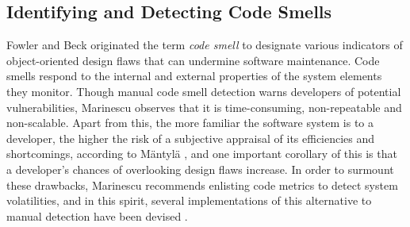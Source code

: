 \subsection{Identifying and Detecting Code Smells}
\revision Fowler and Beck \cite{fowler1999refactoring} originated the term \textit{code smell} to designate various indicators of object-oriented design flaws that can undermine software maintenance. Code smells respond to the internal and external properties of the system elements they monitor. Though manual code smell detection warns developers of potential vulnerabilities, Marinescu \cite{Marinescu_ICETOOLS} observes that it is time-consuming, non-repeatable and non-scalable. Apart from this, the more familiar the software system is to a developer, the higher the risk of a subjective appraisal of its efficiencies and shortcomings, according to Mäntylä \cite{mantyla2003taxonomy, mantyla2004bad}, and one important corollary of this is that a developer's chances of overlooking design flaws increase. In order to surmount these drawbacks, Marinescu recommends enlisting code metrics to detect system volatilities, and in this spirit, several implementations of this alternative to manual detection have been devised \cite{lanza2007object, marinescu2004detection, Marinescu_PhD, Marinescu_IBM_JRD}.


